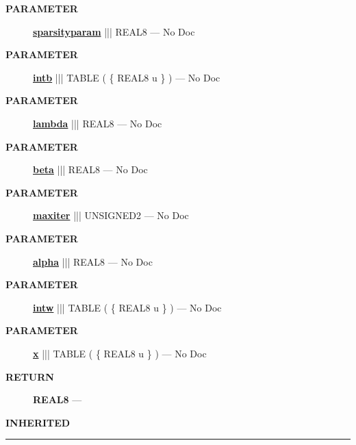 \par
\begin{description}
\item [\colorbox{tagtype}{\color{white} \textbf{\textsf{PARAMETER}}}] \textbf{\underline{sparsityparam}} ||| REAL8 --- No Doc
\item [\colorbox{tagtype}{\color{white} \textbf{\textsf{PARAMETER}}}] \textbf{\underline{intb}} ||| TABLE ( \{ REAL8 u \} ) --- No Doc
\item [\colorbox{tagtype}{\color{white} \textbf{\textsf{PARAMETER}}}] \textbf{\underline{lambda}} ||| REAL8 --- No Doc
\item [\colorbox{tagtype}{\color{white} \textbf{\textsf{PARAMETER}}}] \textbf{\underline{beta}} ||| REAL8 --- No Doc
\item [\colorbox{tagtype}{\color{white} \textbf{\textsf{PARAMETER}}}] \textbf{\underline{maxiter}} ||| UNSIGNED2 --- No Doc
\item [\colorbox{tagtype}{\color{white} \textbf{\textsf{PARAMETER}}}] \textbf{\underline{alpha}} ||| REAL8 --- No Doc
\item [\colorbox{tagtype}{\color{white} \textbf{\textsf{PARAMETER}}}] \textbf{\underline{intw}} ||| TABLE ( \{ REAL8 u \} ) --- No Doc
\item [\colorbox{tagtype}{\color{white} \textbf{\textsf{PARAMETER}}}] \textbf{\underline{x}} ||| TABLE ( \{ REAL8 u \} ) --- No Doc
\end{description}







\par
\begin{description}
\item [\colorbox{tagtype}{\color{white} \textbf{\textsf{RETURN}}}] \textbf{REAL8} --- 
\end{description}






\par
\begin{description}
\item [\colorbox{tagtype}{\color{white} \textbf{\textsf{INHERITED}}}] 
\end{description}



\rule{\linewidth}{0.5pt}




